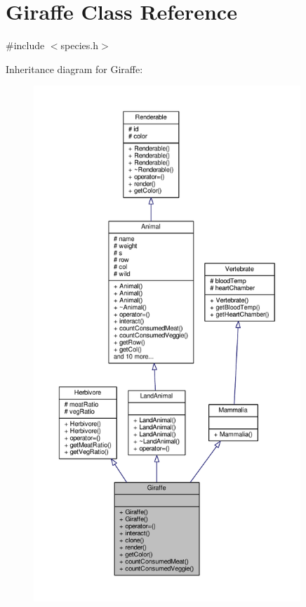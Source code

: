 \hypertarget{classGiraffe}{}\section{Giraffe Class Reference}
\label{classGiraffe}


{\ttfamily \#include $<$species.\+h$>$}



Inheritance diagram for Giraffe\+:
\nopagebreak
\begin{figure}[H]
\begin{center}
\leavevmode
\includegraphics[height=550pt]{classGiraffe__inherit__graph}
\end{center}
\end{figure}


